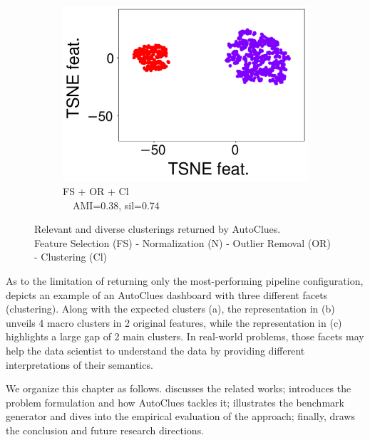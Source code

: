 \begin{figure}[t]
    ~
    \begin{subfigure}[t]{0.31\columnwidth}
        \centering
        \includegraphics[scale=.15]{chapters/data-centric/unsupervised/img/dashboard_2_pred.pdf}
        \caption{FS + OR + Cl\\$\quad$AMI=0.38, sil=0.74}
        \label{clustering-fig:d2}
    \end{subfigure}
    \caption{Relevant and diverse clusterings returned by AutoClues.\\
    \small{Feature Selection (FS) - Normalization (N) - Outlier Removal (OR) - Clustering (Cl)}}
    \label{clustering-fig:dashboard}
\end{figure}

As to the limitation of returning only the most-performing pipeline configuration,  depicts an example of an AutoClues dashboard with three different facets (clustering).
Along with the expected clusters (a), the representation in (b) unveils 4 macro clusters in 2 original features, while the representation in (c) highlights a large gap of 2 main clusters.
In real-world problems, those facets may help the data scientist to understand the data by providing different interpretations of their semantics.

We organize this chapter as follows.
 discusses the related works;  introduces the problem formulation and how AutoClues tackles it;  illustrates the benchmark generator and dives into the empirical evaluation of the approach; finally,  draws the conclusion and future research directions.

